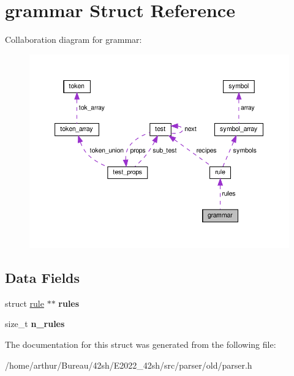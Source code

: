 \hypertarget{structgrammar}{}\section{grammar Struct Reference}
\label{structgrammar}


Collaboration diagram for grammar\+:
\nopagebreak
\begin{figure}[H]
\begin{center}
\leavevmode
\includegraphics[width=350pt]{structgrammar__coll__graph}
\end{center}
\end{figure}
\subsection*{Data Fields}
\begin{DoxyCompactItemize}
\item 
\mbox{\label{structgrammar_a282103c2275ce6e1ae4d02b4698709dd}} 
struct \hyperlink{structrule}{rule} $\ast$$\ast$ {\bfseries rules}
\item 
\mbox{\label{structgrammar_aebc2d8452bd9e44d0ad2b9ad8ac30ed3}} 
size\+\_\+t {\bfseries n\+\_\+rules}
\end{DoxyCompactItemize}


The documentation for this struct was generated from the following file\+:\begin{DoxyCompactItemize}
\item 
/home/arthur/\+Bureau/42sh/\+E2022\+\_\+42sh/src/parser/old/parser.\+h\end{DoxyCompactItemize}
